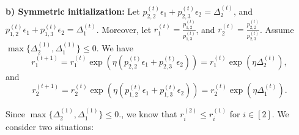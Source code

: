 \noindent \textbf{b) Symmetric initialization:}  
Let $p^{(t)}_{2,2}\epsilon_1+p^{(t)}_{2,3}\epsilon_2=\Delta^{(t)}_2$, and $p^{(t)}_{1,2}\epsilon_1+p^{(t)}_{1,3}\epsilon_2=\Delta^{(t)}_1$. Moreover, let $r^{(t)}_1=\frac{p^{(t)}_{1,2}}{p^{(t)}_{1,3}}$, and $r^{(t)}_2=\frac{p^{(t)}_{2,2}}{p^{(t)}_{2,3}}$. Assume $\max\{\Delta^{(1)}_2,\Delta^{(1)}_1\}\leq 0.$  We have 
\[
  r_{1}^{(t+1)} = r_1^{(t)}\exp\left(\eta{\left(p^{(t)}_{2,2}\epsilon_1 + p^{(t)}_{2,3}\epsilon_2\right)}\right) = r_1^{(t)}\exp(\eta\Delta_2^{(t)}),
\]
and 
\[
  r_{2}^{(t+1)} = r_2^{(t)}\exp\left(\eta{\left(p^{(t)}_{1,2}\epsilon_1 + p^{(t)}_{1,3}\epsilon_2\right)}\right) = r_2^{(t)}\exp(\eta\Delta_1^{(t)}).
\]

\noindent Since $\max\{\Delta^{(1)}_2,\Delta^{(1)}_1\}\leq 0.$, we know that $r_{i}^{(2)}\leq r_{i}^{(1)}$ for $i\in[2]$. We consider two situations: 
